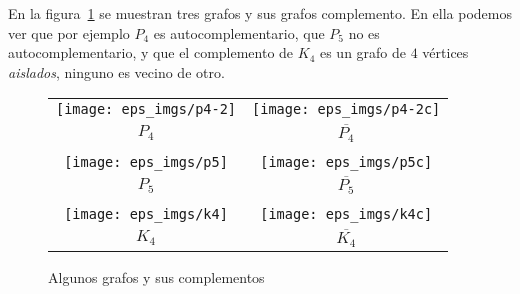 \begin{ejemplo}
En la figura~\ref{fig:complementos} se muestran tres grafos y sus grafos complemento.
En ella podemos ver que por ejemplo $P_4$ es autocomplementario, que $P_5$ no es autocomplementario, y que el complemento de $K_4$ es un grafo de $4$ vértices \emph{aislados}, ninguno es vecino de otro.
\begin{figure}[h!]
\centering
\begin{tabular}{cc}
\texttt{[image: eps\_imgs/p4-2]}\hspace*{3em} &  \texttt{[image: eps\_imgs/p4-2c]} \\
$P_4$\hspace*{3em} & $\overline{P_4}$ \\
& \\
\texttt{[image: eps\_imgs/p5]}\hspace*{3em} &  \texttt{[image: eps\_imgs/p5c]} \\
$P_5$\hspace*{3em} & $\overline{P_5}$ \\
& \\
\texttt{[image: eps\_imgs/k4]}\hspace*{3em} &  \texttt{[image: eps\_imgs/k4c]} \\
$K_4$\hspace*{3em} & $\overline{K_4}$
\end{tabular}
\caption{Algunos grafos y sus complementos}
\label{fig:complementos}
\end{figure}
\end{ejemplo}

